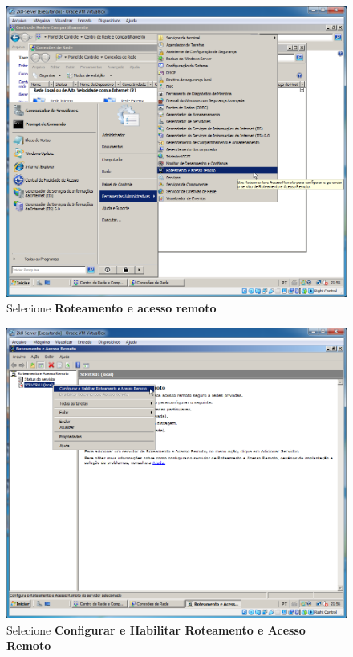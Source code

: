 \documentclass[10pt]{article}
\begin{document}
\begin{figure}[H]
    \centering
    \caption{Selecione \textbf{Roteamento e acesso remoto}}
    \label{fig:re028}
    \includegraphics[width=\linewidth]{images/rede_externa/re028.png}
\end{figure}
\begin{figure}[H]
    \centering
    \caption{Selecione \textbf{Configurar e Habilitar Roteamento e Acesso Remoto}}
    \label{fig:re029}
    \includegraphics[width=\linewidth]{images/rede_externa/re029.png}
\end{figure}
\end{document}
